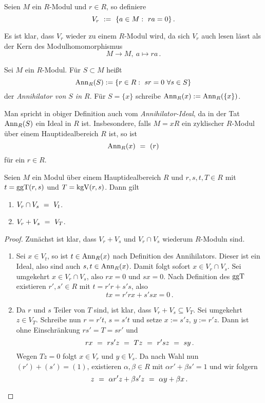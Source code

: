 \begin{definition}
  \label{def:V_r}
  Seien $M$ ein $R$-Modul und $r \in R$, so definiere
  \[ V_r \ :=\  \{ a\in M:\ ra = 0\}\,.\]
\end{definition}


\begin{bemerkung}
  Es ist klar, dass $V_r$ wieder zu einem $R$-Modul wird, da sich $V_r$ auch
  lesen lässt als der Kern des Modulhomomorphismus
  \[ M\to M,\ a \mapsto ra\,.\]
\end{bemerkung}


\begin{definition}[Annihilator]
  Sei $M$ ein $R$-Modul. Für $S\subset M$ heißt
  \[ \Ann_R(S) := \{ r \in R:\ sr = 0\ \forall s\in S\}\]
  der \emph{Annihilator von $S$ in $R$}. 
  Für $S= \{x\}$ schreibe $\operatorname{Ann}_R(x) := \operatorname{Ann}_R(\{x\})$.
\end{definition}

\begin{bemerkung}
  Man spricht in obiger Definition auch vom \emph{Annihilator-Ideal}, da in der
  Tat $\operatorname{Ann}_R(S)$ ein Ideal in $R$ ist. Insbesondere, falls 
  $M = xR$ ein zyklischer $R$-Modul über einem Hauptidealbereich $R$ ist, so
  ist 
  \[ \operatorname{Ann}_R(x) \ =\  (r)\]
  für ein $r\in R$.
\end{bemerkung}

\begin{satz}
  \label{satz:schnitt_plus_vs}
  Seien $M$ ein Modul über einem Hauptidealbereich $R$ und $r,s,t,T\in R$ mit 
  $t = \operatorname{ggT}(r,s)$ und $T = \operatorname{kgV}(r,s)$. Dann gilt
  \begin{enumerate}
    \item $V_r \cap V_s \ =\  V_t$.
    \item $V_r + V_s \ =\  V_T$.
  \end{enumerate}
\end{satz}
\begin{proof}
  Zunächst ist klar, dass $V_r+V_s$ und $V_r\cap V_s$ wiederum $R$-Moduln sind.
  \begin{enumerate}
    \item Sei $x\in V_t$, so ist $t \in \operatorname{Ann}_R(x)$ nach Definition des
      Annihilators. Dieser ist ein Ideal, also sind auch $s,t\in \operatorname{Ann}_R(x)$.
      Damit folgt sofort $x \in V_r\cap V_s$.
      Sei umgekehrt $x \in V_r \cap V_s$, also $rx = 0$ und $sx = 0$. 
      Nach Definition des $\operatorname{ggT}$ existieren $r',s'\in R$ mit 
      $t = r'r + s's$, also 
      \[ tx = r'rx + s'sx = 0\,.\]
    \item Da $r$ und $s$ Teiler von $T$ sind, ist klar, dass
      $V_r+V_s \subseteq V_T$. Sei umgekehrt $z\in V_T$.
      Schreibe nun $r = r't$, $s = s't$ und setze
      $x := s'z$, $y:=r'z$. Dann ist 
      ohne Einschränkung $rs'=T=sr'$ und 
      \[ rx \ =\  rs'z \ =\  Tz \ =\  r'sz \ =\  sy\,. \]
      Wegen $Tz = 0$ folgt $x\in V_r$ und $y \in V_s$. Da nach Wahl nun
      $(r')+(s') = (1)$, existieren $\alpha,\beta\in R$ mit 
      $\alpha r' + \beta s' = 1$ und wir folgern
      \[ z \ =\  \alpha r'z + \beta s'z \ =\  \alpha y + \beta x \,.\]
  \end{enumerate}
\end{proof}



